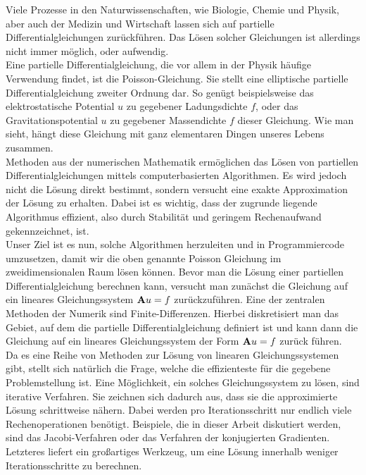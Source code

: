 Viele Prozesse in den Naturwissenschaften, wie Biologie, Chemie und Physik, aber auch der Medizin und Wirtschaft lassen sich auf partielle Differentialgleichungen zurückführen. Das Lösen solcher Gleichungen ist allerdings nicht immer möglich, oder aufwendig. \\
Eine partielle Differentialgleichung, die vor allem in der Physik häufige Verwendung findet, ist die Poisson-Gleichung. Sie stellt eine elliptische partielle Differentialgleichung zweiter Ordnung dar. So genügt beispielsweise das elektrostatische Potential $u$ zu gegebener Ladungsdichte $f$, oder das Gravitationspotential $u$ zu gegebener Massendichte $f$ dieser Gleichung. Wie man sieht, hängt diese Gleichung mit ganz elementaren Dingen unseres Lebens zusammen. \\
Methoden aus der numerischen Mathematik ermöglichen das Lösen von partiellen\\ Differentialgleichungen mittels computerbasierten Algorithmen. Es wird jedoch nicht die Lösung direkt bestimmt, sondern versucht eine exakte Approximation der Lösung zu erhalten. Dabei ist es wichtig, dass der zugrunde liegende Algorithmus effizient, also durch Stabilität und geringem Rechenaufwand gekennzeichnet, ist. \\
Unser Ziel ist es nun, solche Algorithmen herzuleiten und in Programmiercode umzusetzen, damit wir die oben genannte Poisson Gleichung im zweidimensionalen Raum lösen können. Bevor man die Lösung einer partiellen Differentialgleichung berechnen kann, versucht man zunächst die Gleichung auf ein lineares Gleichungssystem ${\textbf{A}} u = f$ zurückzuführen. Eine der zentralen Methoden der Numerik sind Finite-Differenzen. Hierbei diskretisiert man das Gebiet, auf dem die partielle Differentialgleichung definiert ist und kann dann die Gleichung auf ein lineares Gleichungssystem der Form ${\textbf{A}} u = f$ zurück führen. \\
Da es eine Reihe von Methoden zur Lösung von linearen Gleichungssystemen gibt, stellt sich natürlich die Frage, welche die effizienteste für die gegebene Problemstellung ist. Eine Möglichkeit, ein solches Gleichungssystem zu lösen, sind iterative Verfahren. Sie zeichnen sich dadurch aus, dass sie die approximierte Lösung schrittweise nähern. Dabei werden pro Iterationsschritt nur endlich viele Rechenoperationen benötigt. Beispiele, die in dieser Arbeit diskutiert werden, sind das Jacobi-Verfahren oder das Verfahren der konjugierten Gradienten. Letzteres liefert ein großartiges Werkzeug, um eine Lösung innerhalb weniger Iterationsschritte zu berechnen. \\

